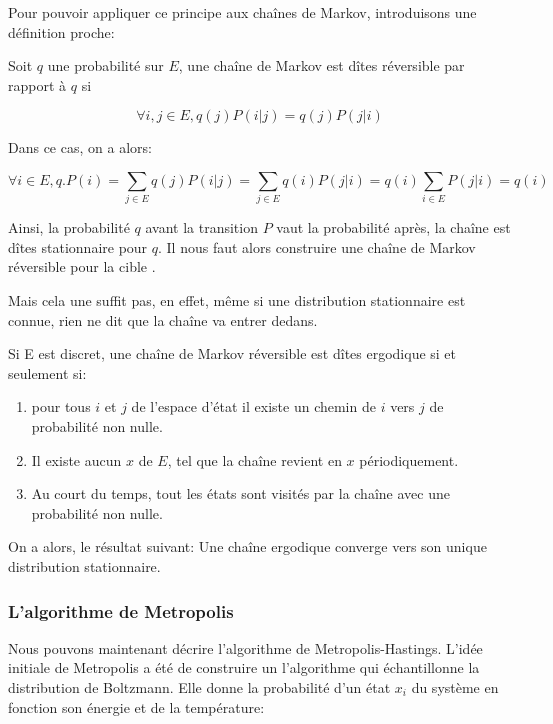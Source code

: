 Pour pouvoir appliquer ce principe aux chaînes de Markov, introduisons une définition proche:

Soit $q$ une probabilité sur $E$, une chaîne de Markov est dîtes réversible par rapport à $q$ si

\begin{equation}
\forall i,j \in E, q(j)P(i|j)=q(j)P(j|i)
\end{equation}

Dans ce cas, on a alors:

\begin{equation}
\forall i \in E, q.P (i) = \sum_{j \in E} q(j)P(i|j) = \sum_{j \in E} q(i)P(j|i) = q(i) \sum_{i \in E}P(j|i) = q(i)
\end{equation}

Ainsi, la probabilité $q$ avant la transition $P$ vaut la probabilité après, la chaîne est dîtes stationnaire pour $q$. Il nous faut alors construire une chaîne de Markov réversible pour la cible \pi.

Mais cela une suffit pas, en effet, même si une distribution stationnaire est connue, rien ne dit que la chaîne va entrer dedans. 

Si E est discret, une chaîne de Markov réversible est dîtes ergodique si et seulement si:

\begin{enumerate}
  \label{crit_ergo}
\item pour tous $i$ et $j$ de l'espace d'état il existe un chemin de $i$  vers $j$  de probabilité non nulle. 
\item Il existe aucun $x$ de $E$, tel que la chaîne revient en $x$ périodiquement.
\item  Au court du temps, tout les états sont visités par la chaîne avec une probabilité non nulle. 
\end{enumerate}

On a alors, le résultat suivant:
Une chaîne ergodique converge vers son unique distribution stationnaire.

\subsubsection{L'algorithme de Metropolis}

Nous pouvons maintenant décrire l'algorithme de Metropolis-Hastings. L'idée initiale de Metropolis a été de construire un l'algorithme qui échantillonne la distribution de Boltzmann. Elle donne la probabilité d'un état $x_i$ du système en fonction son énergie et de la température:

